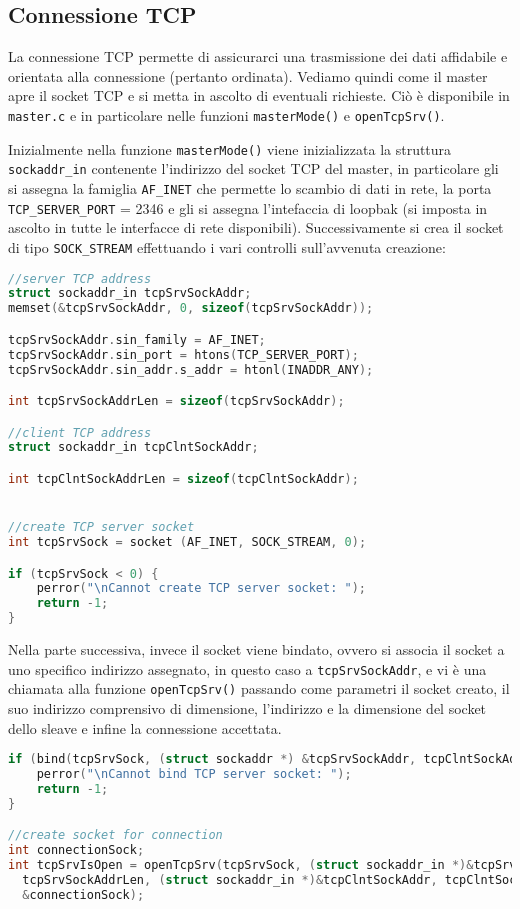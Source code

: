 \documentclass[11pt,fleqn]{book} %
\begin{document}
\subsection{Connessione TCP}
La connessione TCP permette di assicurarci una trasmissione dei dati affidabile e orientata alla connessione (pertanto ordinata). Vediamo quindi come il master apre il socket TCP e si metta in ascolto di eventuali richieste.
Ciò è disponibile in \texttt{master.c} e in particolare nelle funzioni \texttt{masterMode()} e \texttt{openTcpSrv()}.

Inizialmente nella funzione \texttt{masterMode()} viene inizializzata la struttura \texttt{sockaddr\_in} contenente l'indirizzo del socket TCP del master, in particolare gli si assegna la famiglia \texttt{AF\_INET} che permette lo scambio di dati in rete, la porta \texttt{TCP\_SERVER\_PORT} = 2346 e gli si assegna l'intefaccia di loopbak (si imposta in ascolto in tutte le interfacce di rete disponibili).
Successivamente si crea il socket di tipo \texttt{SOCK\_STREAM} effettuando i vari controlli sull'avvenuta creazione:
\begin{lstlisting}[language=C]
//server TCP address
struct sockaddr_in tcpSrvSockAddr;
memset(&tcpSrvSockAddr, 0, sizeof(tcpSrvSockAddr));

tcpSrvSockAddr.sin_family = AF_INET;
tcpSrvSockAddr.sin_port = htons(TCP_SERVER_PORT);
tcpSrvSockAddr.sin_addr.s_addr = htonl(INADDR_ANY);

int tcpSrvSockAddrLen = sizeof(tcpSrvSockAddr);

//client TCP address
struct sockaddr_in tcpClntSockAddr;

int tcpClntSockAddrLen = sizeof(tcpClntSockAddr);


//create TCP server socket
int tcpSrvSock = socket (AF_INET, SOCK_STREAM, 0);

if (tcpSrvSock < 0) {
	perror("\nCannot create TCP server socket: ");
	return -1;
}
\end{lstlisting}

Nella parte successiva, invece il socket viene bindato, ovvero si associa il socket a uno specifico indirizzo assegnato, in questo caso a \texttt{tcpSrvSockAddr}, e vi è una chiamata alla funzione \texttt{openTcpSrv()} passando come parametri il socket creato, il suo indirizzo comprensivo di dimensione, l'indirizzo e la dimensione del socket dello sleave e infine la connessione accettata.

\begin{lstlisting}[language=C]
if (bind(tcpSrvSock, (struct sockaddr *) &tcpSrvSockAddr, tcpClntSockAddrLen) < 0) {
	perror("\nCannot bind TCP server socket: ");
	return -1;
}

//create socket for connection 
int connectionSock;
int tcpSrvIsOpen = openTcpSrv(tcpSrvSock, (struct sockaddr_in *)&tcpSrvSockAddr,
  tcpSrvSockAddrLen, (struct sockaddr_in *)&tcpClntSockAddr, tcpClntSockAddrLen,
  &connectionSock);

\end{lstlisting}
\end{document}
